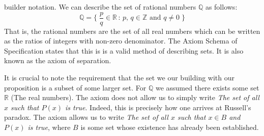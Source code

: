        builder notation. We can describe the set of rational numbers
        $\mathbb{Q}$ as follows:
        \begin{equation}
            \mathbb{Q}=\Big\{\;\frac{p}{q}\in\mathbb{R}\,:
                               \,p,\,q\in\mathbb{Z}
                               \textrm{ and }q\ne{0}\;\Big\}
        \end{equation}
        That is, the rational numbers are the set of all real numbers which
        can be written as the ratios of integers with non-zero denominator.
        The Axiom Schema of Specification states that this is is a valid
        method of describing sets. It is also known as the axiom of
        separation.
        \par\hfill\par
        It is crucial to note the requirement that the set we our building
        with our proposition is a subset of some larger set. For
        $\mathbb{Q}$ we assumed there exists some set $\mathbb{R}$ (The
        real numbers). The axiom does not allow us to simply write
        \textit{The set of all $x$ such that $P(x)$ is true}. Indeed, this is
        precisely how one arrives at Russell's paradox. The axiom
        allows us to write
        \textit{The set of all $x$ such that $x\in{B}$ and $P(x)$ is true},
        where $B$ is some set whose existence has already been established.
